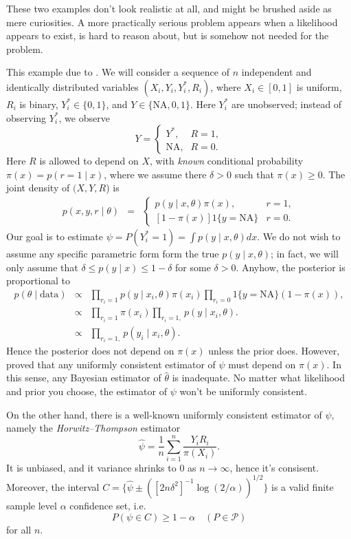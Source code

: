 These two examples don't look realistic at all, and might be brushed
aside as mere curiosities. A more practically serious problem appears
when a likelihood appears to exist, is hard to reason about, but is
somehow not needed for the problem.
\begin{example}
 This example due to \cite{Robins2012-fr}. We will consider a sequence
of $n$ independent and identically distributed variables $(X_{i},Y_{i},Y_{i}^{*},R_{i})$,
where $X_{i}\in[0,1]$ is uniform,  $R_{i}$ is binary, $Y_{i}^{*}\in\{0,1\}$,
and $Y\in\{\textrm{NA},0,1\}$. Here $Y_i^{*}$ are unobserved; instead
of observing $Y_{i}^{*}$, we observe
\[
Y=\begin{cases}
Y^{*}, & R=1,\\
\textrm{NA}, & R=0.
\end{cases}
\]
Here $R$ is allowed to depend on $X$, with \emph{known} conditional
probability $\pi(x)=p(r=1\mid x)$, where we assume there $\delta>0$
such that $\pi(x)\geq0$. The joint density of $(X,Y,R$) is
\begin{eqnarray*}
p(x,y,r\mid\theta) & = & \begin{cases}
p(y\mid x,\theta)\pi(x), & r=1,\\{}
[1-\pi(x)]1\{y=\textrm{NA}\} & r=0.
\end{cases}
\end{eqnarray*}
Our goal is to estimate $\psi=P(Y_{i}^{*}=1)=\int p(y\mid x,\theta)dx$.
We do not wish to assume any specific parametric form form the true
$p(y\mid x,\theta)$; in fact, we will only assume that $\delta\leq p(y\mid x)\leq1-\delta$
for some $\delta>0$. Anyhow, the posterior is proportional to
\begin{eqnarray*}
p(\theta\mid\textrm{data}) & \propto & \prod_{r_{i}=1}p(y\mid x_{i},\theta)\pi(x_{i})\prod_{r_{i}=0}1\{y=\textrm{NA}\}(1-\pi(x)),\\
 & \propto & \prod_{r_{i}=1}\pi(x_{i})\prod_{r_{i}=1,}p(y\mid x_{i},\theta).\\
 & \propto & \prod_{r_{i}=1,}p(y_{i}\mid x_{i},\theta).
\end{eqnarray*}
Hence the posterior does not depend on $\pi(x)$ unless the prior
does. However, \cite{Robins1997-uv} proved that any uniformly consistent
estimator of $\psi$ must depend on $\pi(x)$. In this sense, any Bayesian estimator of $\hat{\theta}$ is inadequate. No matter what likelihood and prior you choose, the estimator of $\psi$ won't be uniformly consistent.

On the other hand, there is a well-known uniformly consistent estimator of $\psi$,
namely the \emph{Horwitz--Thompson} estimator
\begin{equation}
\hat{\psi}=\frac{1}{n}\sum_{i=1}^{n}\frac{Y_{i}R_{i}}{\pi(X_{i})}.\label{eq:Horwitz-Thompson}
\end{equation}
It is unbiased, and it variance shrinks to $0$ as $n\to\infty$,
hence it's consisent. Moreover, the interval $C=\{\hat{\psi}\pm([2n\delta^{2}]^{-1}\log(2/\alpha))^{1/2}\}$
is a valid finite sample level $\alpha$ confidence set, i.e.
\[
P(\psi\in C)\geq1-\alpha\quad(P\in\mathcal{P})
\]
for all $n$.
\end{example}

